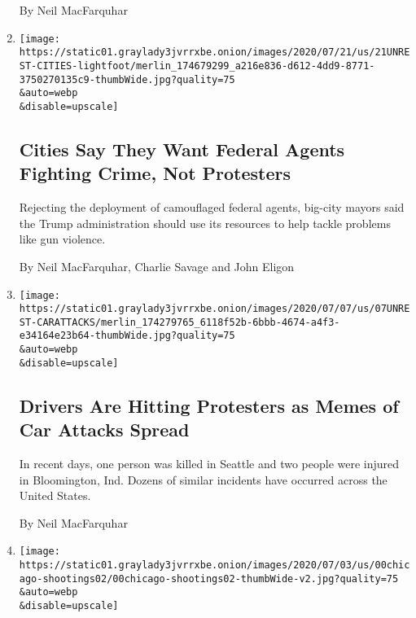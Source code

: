 \begin{enumerate}
  By Neil MacFarquhar
\item
  \href{/2020/07/21/us/trump-federal-agents-chicago.html}{}

  \texttt{[image: https://static01.graylady3jvrrxbe.onion/images/2020/07/21/us/21UNREST-CITIES-lightfoot/merlin\_174679299\_a216e836-d612-4dd9-8771-3750270135c9-thumbWide.jpg?quality=75\\\&auto=webp\\\&disable=upscale]}

  \hypertarget{cities-say-they-want-federal-agents-fighting-crime-not-protesters}{%
  \subsection{Cities Say They Want Federal Agents Fighting Crime, Not
  Protesters}\label{cities-say-they-want-federal-agents-fighting-crime-not-protesters}}

  Rejecting the deployment of camouflaged federal agents, big-city
  mayors said the Trump administration should use its resources to help
  tackle problems like gun violence.

  By Neil MacFarquhar, Charlie Savage and John Eligon
\item
  \href{/2020/07/07/us/bloomington-car-attack-protesters.html}{}

  \texttt{[image: https://static01.graylady3jvrrxbe.onion/images/2020/07/07/us/07UNREST-CARATTACKS/merlin\_174279765\_6118f52b-6bbb-4674-a4f3-e34164e23b64-thumbWide.jpg?quality=75\\\&auto=webp\\\&disable=upscale]}

  \hypertarget{drivers-are-hitting-protesters-as-memes-of-car-attacks-spread}{%
  \subsection{Drivers Are Hitting Protesters as Memes of Car Attacks
  Spread}\label{drivers-are-hitting-protesters-as-memes-of-car-attacks-spread}}

  In recent days, one person was killed in Seattle and two people were
  injured in Bloomington, Ind. Dozens of similar incidents have occurred
  across the United States.

  By Neil MacFarquhar
\item
  \href{/2020/07/05/us/chicago-shootings.html}{}

  \texttt{[image: https://static01.graylady3jvrrxbe.onion/images/2020/07/03/us/00chicago-shootings02/00chicago-shootings02-thumbWide-v2.jpg?quality=75\\\&auto=webp\\\&disable=upscale]}

  \hypertarget{chicago-gun-violence-spikes-and-increasingly-finds-the-youngest-victims}{%
}
\end{enumerate}
